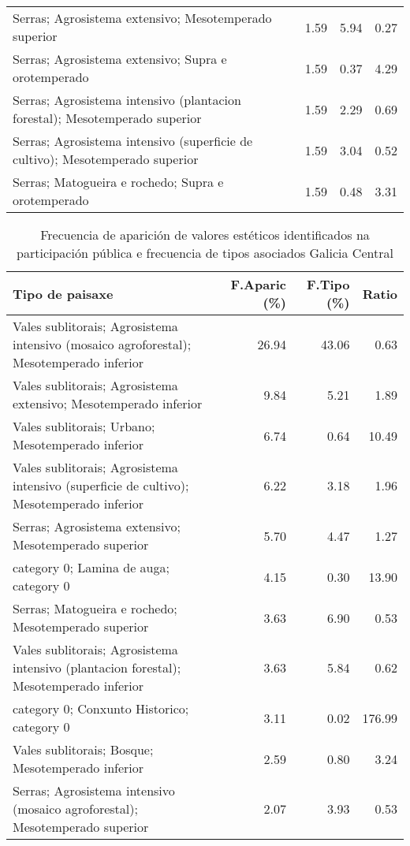 \begin{table}[p]
\begin{tabular}{lrrr}
  Serras; Agrosistema extensivo; Mesotemperado superior & 1.59 & 5.94 & 0.27 \\ 
  Serras; Agrosistema extensivo; Supra e orotemperado & 1.59 & 0.37 & 4.29 \\ 
  Serras; Agrosistema intensivo (plantacion forestal); Mesotemperado superior & 1.59 & 2.29 & 0.69 \\ 
  Serras; Agrosistema intensivo (superficie de cultivo); Mesotemperado superior & 1.59 & 3.04 & 0.52 \\ 
  Serras; Matogueira e rochedo; Supra e orotemperado & 1.59 & 0.48 & 3.31 \\ 
   \hline
\end{tabular}
\end{table}
\begin{table}[p]
\centering
\caption{Frecuencia de aparición de valores estéticos identificados na participación pública e frecuencia de tipos asociados Galicia Central} 
\label{vsixotest7}
\begin{tabular}{lrrr}
  \hline
Tipo de paisaxe & F.Aparic (\%) & F.Tipo (\%) & Ratio \\ 
  \hline
Vales sublitorais; Agrosistema intensivo (mosaico agroforestal); Mesotemperado inferior & 26.94 & 43.06 & 0.63 \\ 
  Vales sublitorais; Agrosistema extensivo; Mesotemperado inferior & 9.84 & 5.21 & 1.89 \\ 
  Vales sublitorais; Urbano; Mesotemperado inferior & 6.74 & 0.64 & 10.49 \\ 
  Vales sublitorais; Agrosistema intensivo (superficie de cultivo); Mesotemperado inferior & 6.22 & 3.18 & 1.96 \\ 
  Serras; Agrosistema extensivo; Mesotemperado superior & 5.70 & 4.47 & 1.27 \\ 
  category 0; Lamina de auga; category 0 & 4.15 & 0.30 & 13.90 \\ 
  Serras; Matogueira e rochedo; Mesotemperado superior & 3.63 & 6.90 & 0.53 \\ 
  Vales sublitorais; Agrosistema intensivo (plantacion forestal); Mesotemperado inferior & 3.63 & 5.84 & 0.62 \\ 
  category 0; Conxunto Historico; category 0 & 3.11 & 0.02 & 176.99 \\ 
  Vales sublitorais; Bosque; Mesotemperado inferior & 2.59 & 0.80 & 3.24 \\ 
  Serras; Agrosistema intensivo (mosaico agroforestal); Mesotemperado superior & 2.07 & 3.93 & 0.53 \\ 

\end{tabular}
\end{table}
